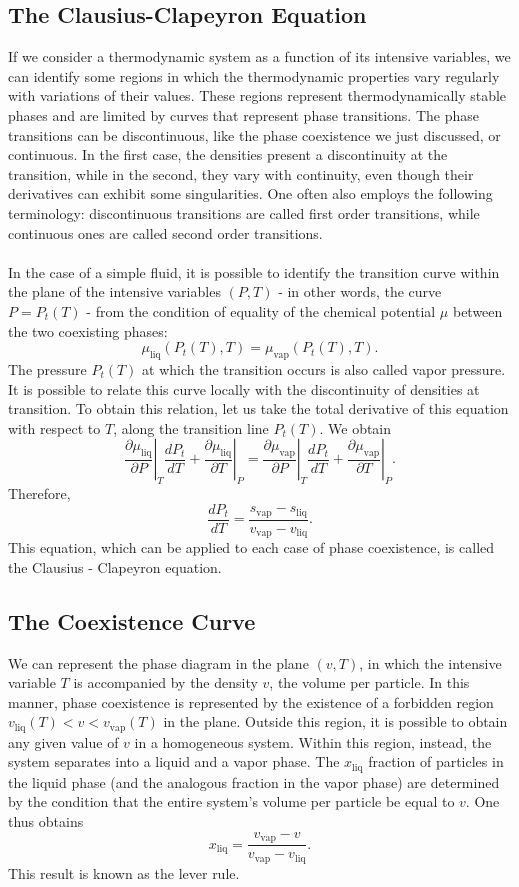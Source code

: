 \subsection{The Clausius-­Clapeyron Equation}
If we consider a thermodynamic system as a function of its intensive variables, we can identify some regions in which the thermodynamic properties vary regularly with variations of their values. These regions represent thermodynamically stable phases and are limited by curves that represent phase transitions. The phase transitions can be discontinuous, like the phase coexistence we just discussed, or continuous. In the first case, the densities present a discontinuity at the transition, while in the second, they vary with continuity, even though their derivatives can exhibit some singularities. One often also employs the following terminology: discontinuous transitions are called first order transitions, while continuous ones are called second order transitions.
\\ \\
In the case of a simple fluid, it is possible to identify the transition curve within the plane of the intensive variables $(P,T)$ - in other words, the curve $P= P_t(T)$ - from the condition of equality of the chemical potential $\mu$ between the two coexisting phases:
\[\mu_{\mathrm{liq}}(P_t(T),T) = \mu_{\mathrm{vap}}(P_t(T),T).\]
The pressure $P_t(T)$ at which the transition occurs is also called vapor pressure. It is possible to relate this curve locally with the discontinuity of densities at transition. To obtain this relation, let us take the total derivative of this equation with respect to $T$, along the transition line $P_t(T)$. We obtain
\[\left. \frac{\partial \mu_{\mathrm{liq}}}{\partial P} \right|_{T} \frac{dP_t}{dT} + \left. \frac{\partial \mu_{\mathrm{liq}}}{\partial T} \right|_{P} = \left. \frac{\partial \mu_{\mathrm{vap}}}{\partial P} \right|_{T} \frac{dP_t}{dT} + \left. \frac{\partial \mu_{\mathrm{vap}}}{\partial T} \right|_{P}.\]
Therefore,
\[\frac{dP_t}{dT} = \frac{s_{\mathrm{vap}}-s_{\mathrm{liq}}}{v_{\mathrm{vap}}-v_{\mathrm{liq}}}.\]
This equation, which can be applied to each case of phase coexistence, is called the Clausius - Clapeyron equation.

\subsection{The Coexistence Curve}
We can represent the phase diagram in the plane $(v,T)$, in which the intensive variable $T$ is accompanied by the density $v$, the volume per particle. In this manner, phase coexistence is represented by the existence of a forbidden region $v_{\mathrm{liq}}(T) < v < v_{\mathrm{vap}}(T)$ in the plane. Outside this region, it is possible to obtain any given value of $v$ in a homogeneous system. Within this region, instead, the system separates into a liquid and a vapor phase. The $x_{\mathrm{liq}}$ fraction of particles in the liquid phase (and the analogous fraction in the vapor phase) are determined by the condition that the entire system's volume per particle be equal to $v$. One thus obtains
\[x_{\mathrm{liq}} = \frac{v_{\mathrm{vap}}-v}{v_{\mathrm{vap}}-v_{\mathrm{liq}}}.\]
This result is known as the lever rule.


